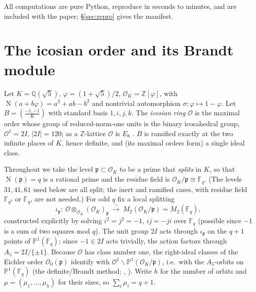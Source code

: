 \documentclass[11pt,a4paper]{article}
\newcommand{\Q}{\mathbb{Q}}
\newcommand{\Z}{\mathbb{Z}}
\newcommand{\F}{\mathbb{F}}
\newcommand{\PP}{\mathbb{P}}
\newcommand{\Ord}{\mathcal{O}}
\newcommand{\fp}{\mathfrak{p}}
\newcommand{\OK}{\Ord_K}
\DeclareMathOperator{\Nm}{N}
\begin{document}
All computations are pure Python, reproduce in seconds to minutes, and
are included with the paper; \S\ref{sec:repro} gives the manifest.

\section{The icosian order and its Brandt module}\label{sec:setup}

Let $K=\Q(\sqrt5)$, $\varphi=(1+\sqrt5)/2$, $\OK=\Z[\varphi]$, with
$\Nm(a+b\varphi)=a^2+ab-b^2$ and nontrivial automorphism
$\sigma:\varphi\mapsto1-\varphi$. Let $B=\left(\tfrac{-1,-1}{K}\right)$
with standard basis $1,i,j,k$. The \emph{icosian ring} $\Ord$ is the
maximal order whose group of reduced-norm-one units is the binary
icosahedral group, $\Ord^1=2I$, $|2I|=120$; as a $\Z$-lattice $\Ord$ is
$E_8$ \cite{ConwaySloane1999,Voight2021}. $B$ is ramified exactly at the
two infinite places of $K$, hence definite, and (its maximal orders
form) a single ideal class.

Throughout we take the level $\fp\subset\OK$ to be a prime that
\emph{splits} in $K$, so that $\Nm(\fp)=q$ is a rational prime and the
residue field is $\OK/\fp\cong\F_q$. (The levels $31,41,61$ used below
are all split; the inert and ramified cases, with residue field
$\F_{q^2}$ or $\F_q$, are not needed.) For odd $q$ fix a local splitting
\[
  \iota_\fp:\ \Ord\otimes_{\OK}(\OK)_\fp\ \xrightarrow{\ \sim\ }\
  M_2(\OK/\fp)=M_2(\F_q),
\]
constructed explicitly by solving $i^2=j^2=-1$, $ij=-ji$ over $\F_q$
(possible since $-1$ is a sum of two squares mod $q$). The unit group
$2I$ acts through $\iota_\fp$ on the $q+1$ points of $\PP^1(\F_q)$;
since $-1\in2I$ acts trivially, the action factors through
$A_5=2I/\{\pm1\}$. Because $\Ord$ has class number one, the right-ideal
classes of the Eichler order $\Ord_0(\fp)$ identify with
$\Ord^1\backslash\PP^1(\OK/\fp)$, i.e.\ with the $A_5$-orbits on
$\PP^1(\F_q)$ (the definite/Brandt method;
\cite[Ch.~41]{Voight2021}, \cite{Vigneras1980}). Write $h$ for the
number of orbits and $\mu=(\mu_1,\dots,\mu_h)$ for their sizes, so
$\sum_i\mu_i=q+1$.
\end{document}

